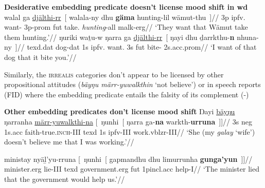 \pex \textbf{Desiderative embedding predicate doesn't license mood shift in \gls{wd}}
\a\begingl\gla walal ga \ul{djälthi-rr}~\textup{[} walala-ny dhu \textbf{gäma} hunting-lil wämut-thu\textup{~]}//
\glb 3p \gls{ipfv}.\I{} want-\I{} 3p-\gls{prom} \gls{fut} take.\I{} \textit{hunting}-\gls{all} \gls{malk}-\gls{erg}//
\glft`They want that Wämut take them hunting.'//\endgl
\a\begingl\gla ŋuriki waṯu-w ŋarra ga \ul{djälthi-rr}~\textup{[} ŋayi dhu ḏarrkthu-\textbf{n} nhuna-ny\textup{~]}//
\glb \gls{texd}.\gls{dat} dog-\gls{dat} 1s \gls{ipfv}.\I{} want.\I{} 3s \gls{fut} bite-\I{} 2s.\gls{acc}.\gls{prom}//
\glft`I want of that dog that it bite you.'//\endgl%
\xe

Similarly, the \textsc{irrealis} categories don't appear to be licensed by other propositional attitudes (\textit{bäyŋu märr-yuwalkthin} `not believe') or in speech reports (FID) where the embedding predicate entails the falsity of its complement (-)

\pex \textbf{Other embedding predicates don't license mood shift}
\a\begingl\gla Ŋayi \ul{bäyŋu} ŋarranha \ul{märr-yuwalkthi-na} \textup[~ŋunhi~\textup[  ŋarra ga-\textbf{na} warkth-\textbf{urruna}\textup{~]]}//
\glb 3s \gls{neg} 1s.\gls{acc} faith-true.\textsc{inch}-\gls{III} \gls{texd} 1s \gls{ipfv}-\gls{III} work.\gls{vblzr}-\gls{III}//
\glft`She (my \textit{galay} `wife') doesn't believe me that I was working.'\trailingcitation{[DhG~20190417]}//\endgl

\a\begingl\gla ministay nyäḻ'yu-rruna \textup[~ŋunhi~\textup[ gapmandhu dhu limurrunha \textbf{gunga'yun}\textup{~]]}//
\glb minister.\gls{erg} lie-\gls{III} \gls{texd} government.\gls{erg} \gls{fut} 1p\gls{incl}.\gls{acc} help-\gls{I}//
\glft`The minister lied that the government would help us.'\trailingcitation{[DhG~20190417]}//\endgl

